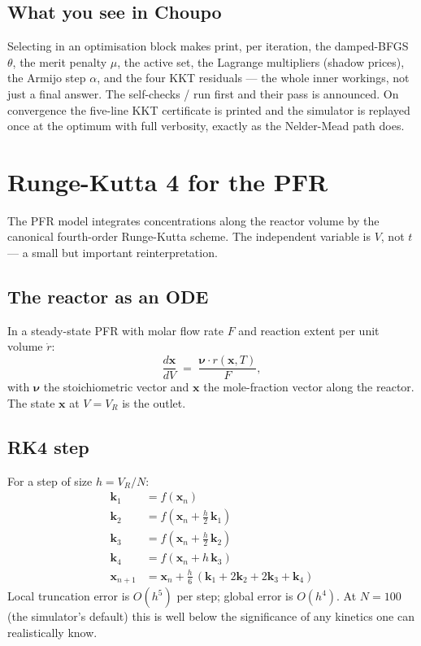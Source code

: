 \documentclass[11pt,a4paper]{article}
\newcommand{\xv}{\mathbf{x}}
\begin{document}
\subsection*{What you see in Choupo}

Selecting  in an  optimisation block
makes  print, per iteration, the damped-BFGS
$\theta$, the merit penalty $\mu$, the active set, the Lagrange
multipliers (shadow prices), the Armijo step $\alpha$, and the four KKT
residuals --- the whole inner workings, not just a final answer. The
self-checks  /  run first and
their pass is announced. On convergence the five-line KKT certificate is
printed and the simulator is replayed once at the optimum with full
verbosity, exactly as the Nelder-Mead path does.

\section{Runge-Kutta 4 for the PFR}\label{ch:rk4}

\begin{whatyoulllearn}
The PFR model integrates concentrations along the reactor volume by
the canonical fourth-order Runge-Kutta scheme. The independent
variable is $V$, not $t$ --- a small but important reinterpretation.
\end{whatyoulllearn}

\subsection{The reactor as an ODE}

In a steady-state PFR with molar flow rate $F$ and reaction extent per
unit volume $\dot r$:
\begin{equation}
   \frac{d \xv}{d V} \;=\; \frac{\boldsymbol\nu \cdot r(\xv, T)}{F},
\end{equation}
with $\boldsymbol\nu$ the stoichiometric vector and $\xv$ the mole-fraction
vector along the reactor. The state $\xv$ at $V = V_R$ is the outlet.

\subsection{RK4 step}

For a step of size $h = V_R / N$:
\begin{align}
   \mathbf{k}_1 &= f(\xv_n) \\
   \mathbf{k}_2 &= f(\xv_n + \tfrac{h}{2}\,\mathbf{k}_1) \\
   \mathbf{k}_3 &= f(\xv_n + \tfrac{h}{2}\,\mathbf{k}_2) \\
   \mathbf{k}_4 &= f(\xv_n + h\,\mathbf{k}_3) \\
   \xv_{n+1}    &= \xv_n + \tfrac{h}{6}\,(\mathbf{k}_1 + 2\mathbf{k}_2 + 2\mathbf{k}_3 + \mathbf{k}_4)
\end{align}
Local truncation error is $O(h^5)$ per step; global error is $O(h^4)$.
At $N = 100$ (the simulator's default) this is well below the
significance of any kinetics one can realistically know.
\end{document}
